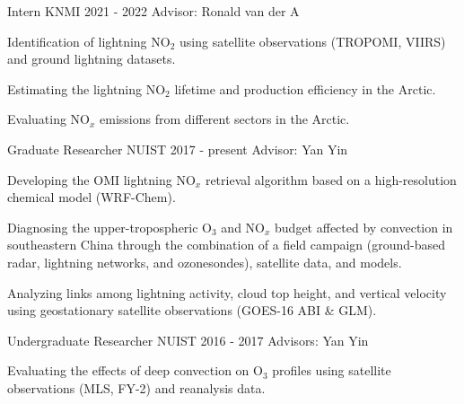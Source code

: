

\begin{cventries}

  \cventry
    {Intern} %
    {KNMI} %
    {2021 - 2022} %
    {Advisor: Ronald van der A} %
    {
      \begin{cvitems} %
        \item {Identification of lightning NO$_2$ using satellite observations (TROPOMI, VIIRS) and ground lightning datasets.}
        \item {Estimating the lightning NO$_2$ lifetime and production efficiency in the Arctic.}
        \item {Evaluating NO$_x$ emissions from different sectors in the Arctic.}
      \end{cvitems}
    }

  \cventry
    {Graduate Researcher} %
    {NUIST} %
    {2017 - present} %
    {Advisor: Yan Yin} %
    {
      \begin{cvitems} %
        \item {Developing the OMI lightning NO$_x$ retrieval algorithm based on a high-resolution chemical model (WRF-Chem).}
        \item {Diagnosing the upper-tropospheric O$_3$ and NO$_x$ budget affected by convection in southeastern China
        through the combination of a field campaign (ground-based radar, lightning networks, and ozonesondes), satellite data, and models.}
        \item {Analyzing links among lightning activity, cloud top height, and vertical velocity using geostationary satellite observations (GOES-16 ABI \& GLM).}
      \end{cvitems}
    }

  \cventry
    {Undergraduate Researcher} %
    {NUIST} %
    {2016 - 2017} %
    {Advisors: Yan Yin} %
    {
      \begin{cvitems} %
        \item {Evaluating the effects of deep convection on O$_3$ profiles using satellite observations (MLS, FY-2) and reanalysis data.}
      \end{cvitems}
    }


\end{cventries}
